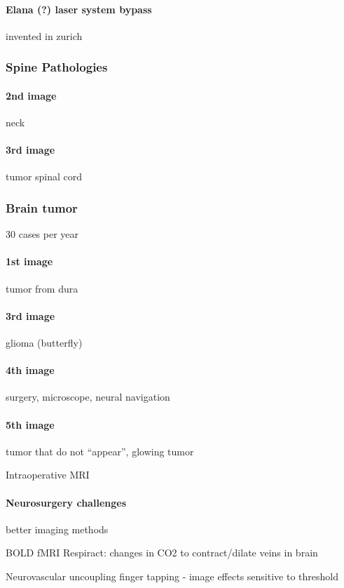\documentclass[12pt,article,oneside,a4paper]{memoir}
\begin{document}
\paragraph{Elana (?) laser system bypass} invented in zurich

\subsubsection{Spine Pathologies}
\paragraph{2nd image} neck
\paragraph{3rd image} tumor spinal cord

\subsubsection{Brain tumor} 30 cases per year
\paragraph{1st image} tumor from dura
\paragraph{3rd image} glioma (butterfly)
\paragraph{4th image} surgery, microscope, neural navigation
\paragraph{5th image} tumor that do not ``appear'', glowing tumor

Intraoperative MRI

\paragraph{Neurosurgery challenges} better imaging methods

BOLD fMRI
Respiract: changes in CO2 to contract/dilate veins in brain

Neurovascular uncoupling
finger tapping - image effects
sensitive to threshold


\newpage
\end{document}
